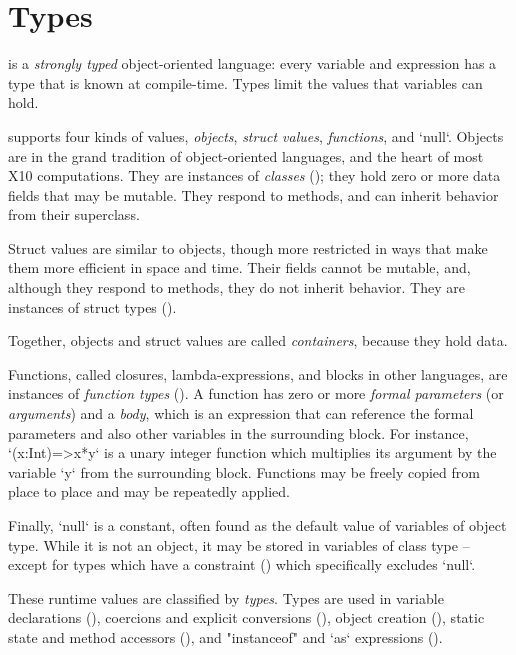 \chapter{Types}
\label{XtenTypes}



{}\Xten{} is a {\em strongly typed} object-oriented language: every
variable and expression has a type that is known at compile-time.
Types limit the values that variables can hold.

{}\Xten{} supports four kinds of values, {\em objects}, {\em struct values},
{\em functions}, and \xcd`null`. Objects are in the grand tradition of
object-oriented languages, and the heart of most X10 computations. They are
instances of {\em classes} 
(); they hold zero or more data fields that may be
mutable. They respond to methods, and can inherit behavior from their
superclass.

Struct values are similar to objects, though more restricted in ways that make
them more efficient in space and time.  Their fields cannot be mutable, and,
although they respond to methods, they do not inherit behavior.  
They are instances of struct types ().

Together, objects and struct values are called {\em containers},
because they hold data.  

Functions, called closures, lambda-expressions, and blocks in other languages,
are 
instances of {\em function types} (). 
A function has zero or more {\em formal parameters} (or {\em arguments}) and a
{\em body}, which is 
an expression that can reference the formal parameters and also other
variables in the surrounding block. For instance, \xcd`(x:Int)=>x*y`
is a unary integer function which multiplies its argument by the
variable \xcd`y` from the surrounding block.  Functions may be freely
copied from place to place and may be repeatedly applied. 

Finally, \xcd`null` is a constant, often found as the default value of
variables of object type. While it is not an object, it may be stored in
variables of class type -- except for types which have a constraint
() which specifically excludes \xcd`null`.

These runtime values are classified by {\em types}. Types are used in
variable declarations (), coercions and  explicit
conversions (), object creation (),
static state and method accessors (), and
\xcd"instanceof" and \xcd`as` expressions ().

